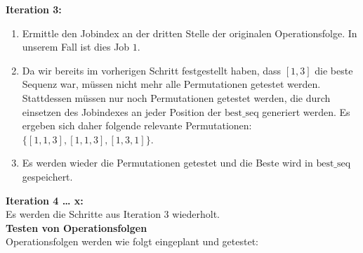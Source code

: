 \documentclass[final, english, ngerman, a4paper, 12pt, %
numbers=noenddot,
cd=true,
cdfont=false,cdfont=nohead,cdfont=nodin,
cdmath=false,
cdhead=false,
cdfoot=true,
cdcover=monochrome,
cdgeometry=symmetric,
declaration=heading,
declaration=notoc,
abstract=heading,
]{tudscrreprt}
\begin{document}
\noindent
\textbf{Iteration 3:}

\begin{enumerate}
	\item Ermittle den Jobindex an der dritten Stelle der originalen Operationsfolge. In unserem Fall ist dies Job $1$.
	\item Da wir bereits im vorherigen Schritt festgestellt haben, dass $[1,3]$ die beste Sequenz war, müssen nicht mehr alle Permutationen getestet werden. Stattdessen müssen nur noch Permutationen getestet werden, die durch einsetzen des Jobindexes an jeder Position der $\text{best\_seq}$ generiert werden. Es ergeben sich daher folgende relevante Permutationen: $\{ [1,1,3], [1,1,3], [1,3,1] \}$.
	\item Es werden wieder die Permutationen getestet und die Beste wird in $\text{best\_seq}$ gespeichert.
\end{enumerate}

\noindent
\textbf{Iteration 4 … x:}\\
\noindent
Es werden die Schritte aus Iteration 3 wiederholt. \\

\noindent
\textbf{Testen von Operationsfolgen}\\
\noindent
Operationsfolgen werden wie folgt eingeplant und getestet:
\end{document}
